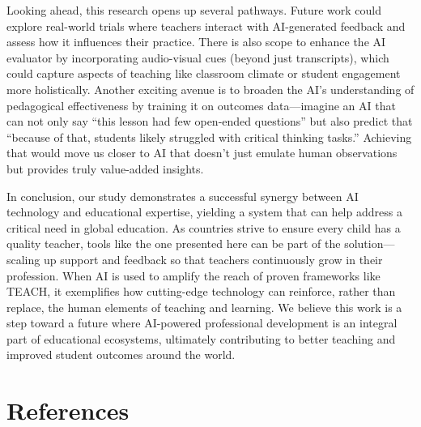 \documentclass[12pt]{article}
\begin{document}
Looking ahead, this research opens up several pathways. Future work could explore real-world trials where teachers interact with AI-generated feedback and assess how it influences their practice. There is also scope to enhance the AI evaluator by incorporating audio-visual cues (beyond just transcripts), which could capture aspects of teaching like classroom climate or student engagement more holistically. Another exciting avenue is to broaden the AI’s understanding of pedagogical effectiveness by training it on outcomes data—imagine an AI that can not only say “this lesson had few open-ended questions” but also predict that “because of that, students likely struggled with critical thinking tasks.” Achieving that would move us closer to AI that doesn’t just emulate human observations but provides truly value-added insights.

In conclusion, our study demonstrates a successful synergy between AI technology and educational expertise, yielding a system that can help address a critical need in global education. As countries strive to ensure every child has a quality teacher, tools like the one presented here can be part of the solution—scaling up support and feedback so that teachers continuously grow in their profession. When AI is used to amplify the reach of proven frameworks like TEACH, it exemplifies how cutting-edge technology can reinforce, rather than replace, the human elements of teaching and learning. We believe this work is a step toward a future where AI-powered professional development is an integral part of educational ecosystems, ultimately contributing to better teaching and improved student outcomes around the world.

\section*{References}
\end{document}
